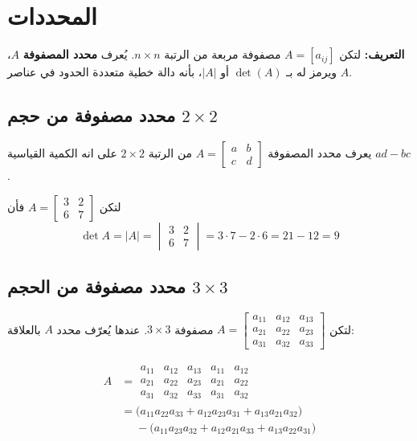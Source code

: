 	\section{المحددات}
	\textbf{التعريف:}  
	لتكن $A = [a_{ij}]$ مصفوفة مربعة من الرتبة $n \times n$. يُعرف \textbf{محدد المصفوفة} $A$، ويرمز له بـ $\det(A)$ أو $|A|$، بأنه دالة خطية متعددة الحدود في عناصر $A$.
	
	\subsection{محدد مصفوفة من حجم $2\times 2$}
	يعرف محدد المصفوفة 
	$
	A=
	\begin{bmatrix}
		a&b\\c&d
	\end{bmatrix}
	$
	من الرتبة $2\times2 $ على انه الكمية القياسية $ad-bc$.
	
	\begin{example}
		لتكن $
		A = 
		\begin{bmatrix}
			3&2\\6&7
		\end{bmatrix}
		$ فأن
		\[
		\det A = |A| = 
		\begin{vmatrix}
			3&2\\6&7
		\end{vmatrix}
		=3\cdot7-2\cdot6 = 21-12=9
		\]
	\end{example} 
	
	\subsection{محدد مصفوفة من الحجم $3\times 3$}
	لتكن $A = 
	\begin{bmatrix}
		a_{11} & a_{12} & a_{13} \\
		a_{21} & a_{22} & a_{23} \\
		a_{31} & a_{32} & a_{33}
	\end{bmatrix}$
	مصفوفة $3\times 3$. عندها يُعرّف محدد $A$ بالعلاقة:
	
	\begin{align*}
		A &= 
		\begin{array}{|ccc|cc}
			a_{11}&a_{12}&a_{13}&a_{11}&a_{12}\\
			a_{21}&a_{22}&a_{23}&a_{21}&a_{22}\\
			a_{31}&a_{32}&a_{33}&a_{31}&a_{32}
		\end{array}\\
		&= \big(a_{11}a_{22}a_{33}+a_{12}a_{23}a_{31}+a_{13}a_{21}a_{32}\big)\\
		&\phantom{=}- \big(a_{11}a_{23}a_{32}+a_{12}a_{21}a_{33}+a_{13}a_{22}a_{31}\big)
	\end{align*}
	

